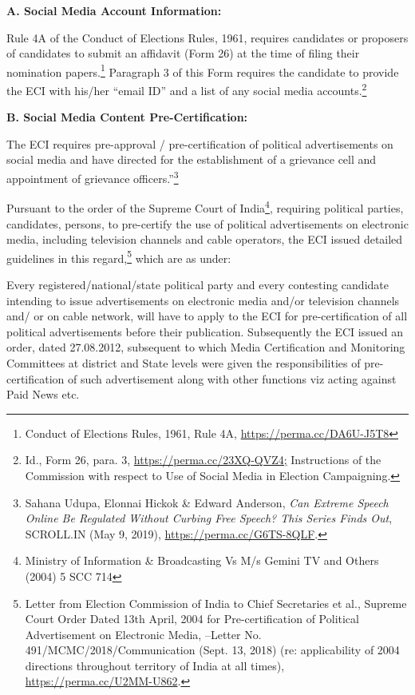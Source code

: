 \begin{multicols}{2}
\vspace{-.15cm}
\noi
{\large\bfseries A. Social Media Account Information:}

\vspace{-.15cm}
\noi
Rule 4A of the Conduct of Elections Rules, 1961, requires candidates or proposers of
candidates to submit an affidavit (Form 26) at the time of filing their nomination
papers.\footnote{Conduct of Elections Rules, 1961, Rule 4A, \url{https://perma.cc/DA6U-J5T8}} Paragraph 3 of this Form requires the candidate to provide the ECI with his/her “email ID” and a list of any social media accounts.\footnote{Id., Form 26, para. 3, \url{https://perma.cc/23XQ-QVZ4;} Instructions of the Commission with respect to Use of Social Media in Election Campaigning.}

\vspace{-.15cm}
\noi
{\large\bfseries B. Social Media Content Pre-Certification:}

\vspace{-.15cm}
\noi
The ECI requires pre-approval / pre-certification of political advertisements on social media
and have directed for the establishment of a grievance cell and appointment of grievance
officers.”\footnote{Sahana Udupa, Elonnai Hickok \& Edward Anderson, \textit{Can Extreme Speech Online Be Regulated Without
Curbing Free Speech? This Series Finds Out}, SCROLL.IN (May 9, 2019), \url{https://perma.cc/G6TS-8QLF}.}

\noi
Pursuant to the order of the Supreme Court of India\footnote{ Ministry of Information \& Broadcasting Vs M/s Gemini TV and Others (2004) 5 SCC 714}, requiring political parties, candidates,
persons, to pre-certify the use of political advertisements on electronic media, including
television channels and cable operators, the ECI issued detailed guidelines in this regard,\footnote{Letter from Election Commission of India to Chief Secretaries et al., Supreme Court Order Dated 13th April, 2004 for Pre-certification of Political Advertisement on Electronic Media, –Letter No. 491/MCMC/2018/Communication (Sept. 13, 2018) (re: applicability of 2004 directions throughout territory of India at all times), \url{https://perma.cc/U2MM-U862}.} which are as under:

\noi
Every registered/national/state political party and every contesting candidate intending to
issue advertisements on electronic media and/or television channels and/ or on cable network,
will have to apply to the ECI for pre-certification of all political advertisements before their
publication. Subsequently the ECI issued an order, dated 27.08.2012, subsequent to which
Media Certification and Monitoring Committees at district and State levels were given the
responsibilities of pre-certification of such advertisement along with other functions viz
acting against Paid News etc.


\end{multicols}
